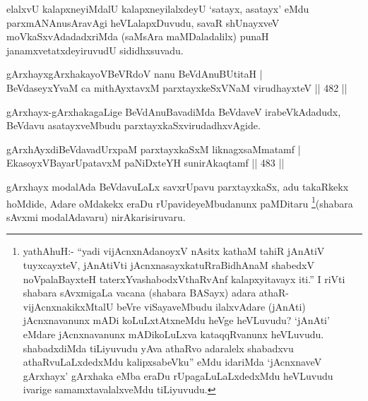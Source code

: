 \begin{artha}
elalxvU kalapxneyiMdalU kalapxneyilalxdeyU `satayx, asatayx' eMdu parxmANAnusAravAgi heVLalapxDuvudu, savaR shUnayxveV moVkaSxvAdadadxriMda (saMsAra maMDaladalilx) punaH janamxvetatxdeyiruvudU sididhxsuvadu.
\end{artha}


\begin{shl}
gArxhayxgArxhakayoVBeVRdoV nanu BeVdAnuBUtitaH | \\
BeVdaseyxYvaM ca mithAyxtavxM parxtayxkeSxVNaM virudhayxteV \hfill||  482 ||  
\end{shl}

\begin{artha}
gArxhayx-gArxhakagaLige BeVdAnuBavadiMda BeVdaveV irabeVkAdadudx, BeVdavu asatayxveMbudu parxtayxkaSxvirudadhxvAgide.
\end{artha}

\begin{shl}
gArxhAyxdiBeVdavadUrxpaM parxtayxkaSxM liknagxsaMmatamf | \\
EkasoyxVBayarUpatavxM paNiDxteYH sunirAkaqtamf \hfill||  483 ||  
\end{shl}

\begin{artha}
gArxhayx modalAda BeVdavuLaLx savxrUpavu parxtayxkaSx, adu takaRkekx hoMdide, Adare oMdakekx eraDu rUpavideyeMbudanunx paMDitaru \footnote{yathAhuH:- ``yadi vijAcnxnAdanoyxV nAsitx kathaM tahiR jAnAtiV tuyxcayxteV, jAnAtiVti jAcnxnasayxkatuRraBidhAnaM shabedxV noVpalaBayxteH taterxYvashabodxV\s thaRvAnf kalapxyitavayx iti.'' I riVti shabara sAvxmigaLa vacana (shabara BASayx) adara athaR- vijAcnxnakikxMtalU beVre viSayaveMbudu ilalxvAdare (jAnAti) jAcnxnavanunx mADi koLuLxtAtxneMdu heVge heVLuvudu? `jAnAti' eMdare jAcnxnavanunx mADikoLuLxva kataqqRvanunx heVLuvudu. shabadxdiMda tiLiyuvudu yAva athaRvo adaralelx shabadxvu athaRvuLaLxdedxMdu kalipxsabeVku'' eMdu idariMda `jAcnxnaveV gArxhayx' gArxhaka eMba eraDu rUpagaLuLaLxdedxMdu heVLuvudu ivarige samamxtavalalxveMdu tiLiyuvudu.}(shabara sAvxmi modalAdavaru) nirAkarisiruvaru.
\end{artha}


